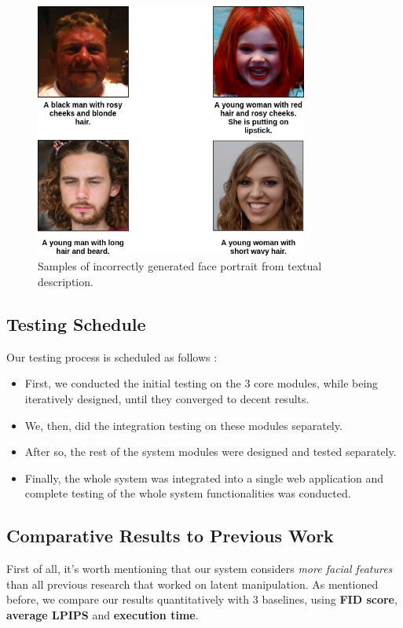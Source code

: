 \begin{figure}[H]
    \centering
    \includegraphics[width=0.8\textwidth]{images/incorrect-results.png}
    \caption{Samples of incorrectly generated face portrait from textual description.}
    \label{fig:incorrect}
\end{figure}

\subsection{Testing Schedule}
Our testing process is scheduled as follows :
\begin{itemize}
    \item First, we conducted the initial testing on the $3$ core modules, while being iteratively designed, until they converged to decent results.
    \item We, then, did the integration testing on these modules separately.
    \item After so, the rest of the system modules were designed and tested separately.
    \item Finally, the whole system was integrated into a single web application and complete testing of the whole system functionalities was conducted.
\end{itemize}

\subsection{Comparative Results to Previous Work}
First of all, it's worth mentioning that our system considers \emph{more facial features} than all previous research that worked on latent manipulation. As mentioned before, we compare our results quantitatively with $3$ baselines, using \textbf{FID score}, \textbf{average LPIPS} and \textbf{execution time}.


